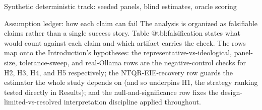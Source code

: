 \documentclass[
  ignorenonframetext,
]{beamer}
\begin{document}
\begin{frame}{Synthetic deterministic track:
seeded panels, blind estimates, oracle scoring}
\begin{block}{Assumption ledger: how each claim can fail}
\protect{}\label{assumption-ledger-how-each-claim-can-fail}
The analysis is organized as falsifiable claims rather than a single
success story. Table @tbl:falsification states what would count against
each claim and which artifact carries the check. The rows map onto the
Introduction's hypotheses: the representative-vs-ideological,
panel-size, tolerance-sweep, and real-Ollama rows are the
negative-control checks for H2, H3, H4, and H5 respectively; the
NTQR-EIE-recovery row guards the estimator the whole study depends on
(and so underpins H1, the strategy ranking tested directly in Results);
and the null-and-significance row fixes the design-limited-vs-resolved
interpretation discipline applied throughout.


\end{block}
\end{frame}
\end{document}
